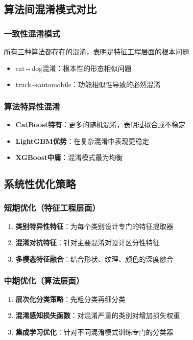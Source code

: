\documentclass[UTF8]{report}
\theoremstyle{MyLineTheoremStyle} %
\theoremstyle{MyBlockTheoremStyle} %
\theoremstyle{MySubsubsectionStyle} %
\begin{document}
\subsection{算法间混淆模式对比}
\subsubsection{一致性混淆模式}
所有三种算法都存在的混淆，表明是特征工程层面的根本问题
\begin{itemize}
    \item cat↔dog混淆：根本性的形态相似问题
    \item truck→automobile：功能相似性导致的必然混淆
\end{itemize}
\subsubsection{算法特异性混淆}
\begin{itemize}
    \item \textbf{CatBoost特有}：更多的随机混淆，表明过拟合或不稳定
    \item \textbf{LightGBM优势}：在复杂混淆中表现更稳定
    \item \textbf{XGBoost中庸}：混淆模式最为均衡
\end{itemize}

\subsection{系统性优化策略}
\subsubsection{短期优化（特征工程层面）}
\begin{enumerate}
    \item \textbf{类别特异性特征}：为每个类别设计专门的特征提取器
    \item \textbf{混淆对抗特征}：针对主要混淆对设计区分性特征
    \item \textbf{多模态特征融合}：结合形状、纹理、颜色的深度融合
\end{enumerate}
\subsubsection{中期优化（算法层面）}
\begin{enumerate}
    \item \textbf{层次化分类策略}：先粗分类再细分类
    \item \textbf{混淆感知损失函数}：对混淆严重的类别对增加损失权重
    \item \textbf{集成学习优化}：针对不同混淆模式训练专门的分类器
\end{enumerate}
\end{document}
